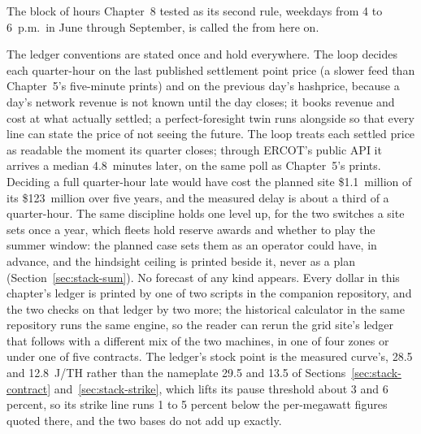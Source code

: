 The block of hours Chapter~8 tested as its second rule, weekdays from 4 to 6~p.m.\ in June through September, is called the  from here on. %

The ledger conventions are stated once and hold everywhere. The loop decides each quarter-hour on the last published settlement point price (a slower feed than Chapter~5's five-minute prints) and on the previous day's hashprice, because a day's network revenue is not known until the day closes; it books revenue and cost at what actually settled; a perfect-foresight twin runs alongside so that every line can state the price of not seeing the future. The loop treats each settled price as readable the moment its quarter closes; through ERCOT's public API it arrives a median 4.8~minutes later, on the same poll as Chapter~5's prints. Deciding a full quarter-hour late would have cost the planned site \$1.1~million of its \$123~million over five years, and the measured delay is about a third of a quarter-hour. The same discipline holds one level up, for the two switches a site sets once a year, which fleets hold reserve awards and whether to play the summer window: the planned case sets them as an operator could have, in advance, and the hindsight ceiling is printed beside it, never as a plan (Section~\ref{sec:stack-sum}). No forecast of any kind appears. Every dollar in this chapter's ledger is printed by one of two scripts in the companion repository, and the two checks on that ledger by two more; the historical calculator in the same repository runs the same engine, so the reader can rerun the grid site's ledger that follows with a different mix of the two machines, in one of four zones or under one of five contracts. The ledger's stock point is the measured curve's, 28.5 and 12.8~J/TH rather than the nameplate 29.5 and 13.5 of Sections~\ref{sec:stack-contract} and~\ref{sec:stack-strike}, which lifts its pause threshold about 3 and 6 percent, so its strike line runs 1 to 5 percent below the per-megawatt figures quoted there, and the two bases do not add up exactly. %